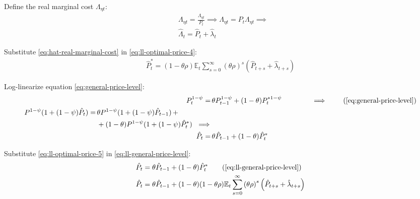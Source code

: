 \documentclass[
	12pt,
	]{article}
\numberwithin{equation}{section}
\newcommand{\E}[1][t]{{\mathbb{E}_{#1}}}
\theoremstyle{definition}
\theoremstyle{plain}
\theoremstyle{plain}
\theoremstyle{plain}
\begin{document}
Define the real marginal cost $\Lambda_{\eta t}$:
\begin{align}
	& \Lambda_{\eta t} = \frac{\Lambda_{\eta t}}{P_t} \implies \Lambda_{\eta t} = P_t \Lambda_{\eta t} \implies \nonumber \\
	& \hat{\Lambda}_t = \hat{P}_t + \hat{\lambda}_t \label{eq:hat-real-marginal-cost}
\end{align}

Substitute \ref{eq:hat-real-marginal-cost} in \ref{eq:ll-optimal-price-4}:
\begin{align}
	\hat{P}_t^\ast = (1- \theta \rho) \E \sum_{s=0}^{\infty} \left( \theta \rho \right)^s \left( \hat{P}_{t+s} + \hat{\lambda}_{t+s} \right) \label{eq:ll-optimal-price-5}
\end{align}

Log-linearize equation \ref{eq:general-price-level}:
\begin{align}
	P_t^{1-\psi} =\, &\theta P_{t-1}^{1-\psi} + (1-\theta) P_t^{\ast 1-\psi} \qquad \qquad \implies \tag{\ref{eq:general-price-level}} \\
	\begin{split} P^{1-\psi} (1 + (1-\psi)\hat{P}_t) =\, &\theta P^{1-\psi} (1 + (1-\psi)\hat{P}_{t-1}) \, + \\ & + (1-\theta) P^{1-\psi} (1 + (1-\psi)\hat{P}_t^\ast) \ \implies \nonumber \end{split} \\
	\hat{P}_t =\, &\theta \hat{P}_{t-1} + (1-\theta) \hat{P}_t^\ast
	\label{eq:ll-general-price-level}
\end{align}

Substitute \ref{eq:ll-optimal-price-5} in \ref{eq:ll-general-price-level}:
\begin{align}
	\hat{P}_t &= \theta \hat{P}_{t-1} + (1-\theta) \hat{P}_t^\ast \tag{\ref{eq:ll-general-price-level}}\\
	\hat{P}_t &= \theta \hat{P}_{t-1} + (1-\theta) (1- \theta \rho) \E \sum_{s=0}^{\infty} \left( \theta \rho \right)^s \left( \hat{P}_{t+s} + \hat{\lambda}_{t+s} \right) \label{eq:ll-general-price-level-2}
\end{align}
\end{document}
